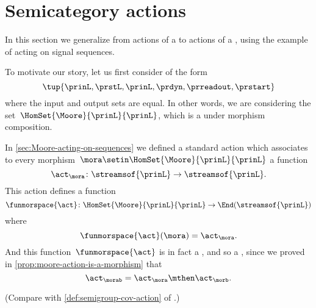 
\section{Semicategory actions}
\label{sec:action-of-a-category}


In this section we generalize from actions of a  to actions of a , using the example of  acting on signal sequences.

To motivate our story, let us first consider  of the form
\begin{equation}\label{eq:generic-moore-machine}
    \tup{\prinL,\prstL,\prinL,\prdyn,\prreadout,\prstart}
\end{equation}
where the input and output sets are equal.
In other words, we are considering the set~$\HomSet{\Moore}{\prinL}{\prinL}$, which is a  under morphism composition.

In \cref{sec:Moore-acting-on-sequences} we defined a standard action which associates to every morphism~$\mora \setin \HomSet{\Moore}{\prinL}{\prinL}$ a function
\begin{equation}\label{eq:defining-act-moore-functions}
    \act_{\mora} \colon \streamsof{\prinL} \to \streamsof{\prinL}.
\end{equation}
This action defines a function
\begin{equation}\label{eq:defining-act-moor-functor-on-arrows}
    \funmorspace{\act} \colon \HomSet{\Moore}{\prinL}{\prinL} \to \End (\streamsof{\prinL})
\end{equation}
where
\begin{equation}
    \funmorspace{\act}(\mora) = \act_{\mora}.
\end{equation}
And this function~$\funmorspace{\act}$ is in fact a , and so a , since we proved in \cref{prop:moore-action-is-a-morphism} that
\begin{equation}
    \act_{\morab} = \act_\mora \mthen \act_\morb.
\end{equation}

(Compare with \cref{def:semigroup-cov-action} of .)

